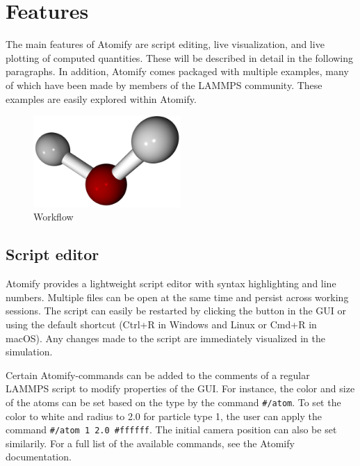 \documentclass[aps,pre,twocolumn,letterpaper,floatfix]{revtex4}
\begin{document}
\section{Features}

The main features of Atomify are script editing,
live visualization, and live plotting of computed quantities.
These will be described in detail in the following paragraphs.
In addition, Atomify comes packaged with multiple examples,
many of which have been made by members of the LAMMPS community.
These examples are easily explored within Atomify.

\begin{figure}
	\centering
	\includegraphics[width=0.5\textwidth]{final_billboard.png}
	\caption{Workflow}
	\label{fig:gui}
\end{figure}


\subsection{Script editor}

Atomify provides a lightweight script editor with syntax highlighting and line
numbers.
Multiple files can be open at the same time and persist across working sessions.
The script can easily be restarted by clicking the button in the GUI or using
the default shortcut (Ctrl+R in Windows and Linux or Cmd+R in macOS).
Any changes made to the script are immediately visualized in the simulation.

Certain Atomify-commands can be added to the comments of a regular LAMMPS script
to modify properties of the GUI.
For instance, the color and size of the atoms can be set based on the type by
the command \texttt{\#/atom}.
To set the color to white and radius to 2.0 for particle type 1,
the user can apply the command \texttt{\#/atom 1 2.0 \#ffffff}.
The initial camera position can also be set similarily.
For a full list of the available commands, see the Atomify documentation.
\end{document}
